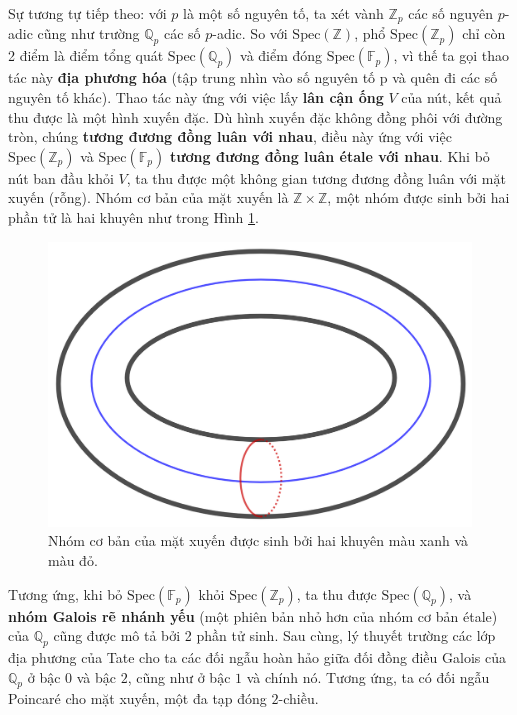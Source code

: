 \documentclass[12pt]{article}
\begin{document}
Sự tương tự tiếp theo: với $p$ là một số nguyên tố, ta xét vành $\mathbb{Z}_p$ các số nguyên $p$-adic cũng như trường $\mathbb{Q}_p$ các số $p$-adic. So với $\text{Spec}(\mathbb{Z})$, phổ $\text{Spec}(\mathbb{Z}_p)$ chỉ còn 2 điểm là điểm tổng quát $\text{Spec}(\mathbb{Q}_p)$ và điểm đóng $\text{Spec}(\mathbb{F}_p)$, vì thế ta gọi thao tác này {\bf địa phương hóa} (tập trung nhìn vào số nguyên tố p và quên đi các số nguyên tố khác). Thao tác này ứng với việc lấy {\bf lân cận ống} $V$ của nút, kết quả thu được là một hình xuyến đặc. Dù hình xuyến đặc không đồng phôi với đường tròn, chúng {\bf tương đương đồng luân với nhau}, điều này ứng với việc $\text{Spec}(\mathbb{Z}_p)$ và $\text{Spec}(\mathbb{F}_p)$ {\bf tương đương đồng luân étale với nhau}. Khi bỏ nút ban đầu khỏi $V$, ta thu được một không gian tương đương đồng luân với mặt xuyến (rỗng). Nhóm cơ bản của mặt xuyến là $\mathbb{Z} \times \mathbb{Z}$, một nhóm được sinh bởi hai phần tử là hai khuyên như trong Hình \ref{h13}.

\begin{figure}[h!]
    \centering
    \includegraphics[scale = .15]{h13}
    \caption{Nhóm cơ bản của mặt xuyến được sinh bởi hai khuyên màu xanh và màu đỏ.}
    \label{h13}
\end{figure}

Tương ứng, khi bỏ $\text{Spec}(\mathbb{F}_p)$ khỏi $\text{Spec}(\mathbb{Z}_p)$, ta thu được $\text{Spec}(\mathbb{Q}_p)$, và {\bf nhóm Galois rẽ nhánh yếu} (một phiên bản nhỏ hơn của nhóm cơ bản étale) của $\mathbb{Q}_p$ cũng được mô tả bởi 2 phần tử sinh. Sau cùng, lý thuyết trường các lớp địa phương của Tate cho ta các đối ngẫu hoàn hảo giữa đối đồng điều Galois của  $\mathbb{Q}_p$ ở bậc $0$ và bậc $2$, cũng như ở bậc $1$ và chính nó. Tương ứng, ta có đối ngẫu Poincaré cho mặt xuyến, một đa tạp đóng $2$-chiều.
\end{document}
